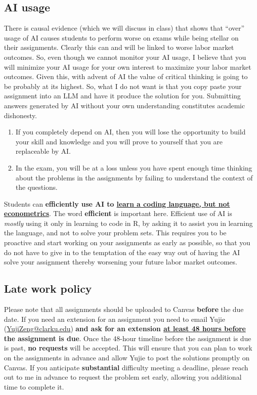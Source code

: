 \documentclass[11pt]{article}
\makeatletter
\newcommand{\TAShort}{Yujie}
\newcommand{\TAEmail}{YujiZeng@clarku.edu}
\newcommand{\ul}[1]{\underline{#1}}
\makeatother
\begin{document}
\subsection{AI usage}\hspace{0pt}\par
There is causal evidence (which we will discuss in class) that shows that
``over'' usage of AI causes students to perform worse on exams while being
stellar on their assignments. Clearly this can and will be linked to worse labor
market outcomes. So, even though we cannot monitor your AI usage, I believe that
you will minimize your AI usage for your own interest to maximize your labor
market outcomes. Given this, with advent of AI the value of critical thinking is
going to be probably at its highest. So, what I do not want is that you copy
paste your assignment into an LLM and have it produce the solution for you.
Submitting answers generated by AI without your own understanding constitutes
academic dishonesty.

\begin{enumerate}
  \item If you completely depend on AI, then you will lose the opportunity to
        build your skill and knowledge and you will prove to yourself that you
        are replaceable by AI.
  \item In the exam, you will be at a loss unless you have spent enough time
        thinking about the problems in the assignments by failing to understand
        the context of the questions.
\end{enumerate}

Students can \textbf{efficiently use AI to \ul{learn a coding language, but not
econometrics}}. The word \textbf{efficient} is important here. Efficient use of
AI is \emph{mostly} using it only in learning to code in R, by asking it to
assist you in learning the language, and not to solve your problem sets. This
requires you to be proactive and start working on your assignments as early as
possible, so that you do not have to give in to the temptation of the easy way
out of having the AI solve your assignment thereby worsening your future labor
market outcomes.

\subsection{Late work policy}\hspace{0pt}\par
Please note that all assignments should be uploaded to Canvas \textbf{before} the
due date. If you need an extension for an assignment you need to email \TAShort{}
(\href{mailto:\TAEmail}{\TAEmail}) \textbf{and ask for an extension \ul{at least
48 hours before} the assignment is due}. Once the 48-hour timeline before the
assignment is due is past, \textbf{no requests} will be accepted. This will
ensure that you can plan to work on the assignments in advance and allow
\TAShort{} to post the solutions promptly on Canvas. If you anticipate
\textbf{substantial} difficulty meeting a deadline, please reach out to me in
advance to request the problem set early, allowing you additional time to
complete it.
\end{document}
